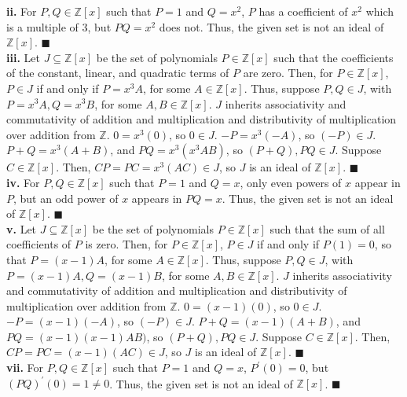 \documentclass{article}%
\begin{document}
\textbf{ii.} For $P, Q \in \mathbb{Z}[x]$ such that $P = 1$ and $Q = x^2$, $P$
has a coefficient of $x^2$ which is a multiple of $3$, but $PQ = x^2$ does
not. Thus, the given set is not an ideal of $\mathbb{Z}[x]$.
\qquad $\blacksquare$ \\

\textbf{iii.} Let $J \subseteq \mathbb{Z}[x]$ be the set of polynomials $P \in
\mathbb{Z}[x]$ such that the coefficients of the constant, linear, and
quadratic terms of $P$ are zero. Then, for $P \in \mathbb{Z}[x]$, $P \in J$ if
and only if $P = x^3A$, for some $A \in \mathbb{Z}[x]$. Thus, suppose $P, Q
\in J$, with $P = x^3A, Q = x^3B$, for some $A, B \in \mathbb{Z}[x]$. $J$
inherits associativity and commutativity of addition and multiplication and
distributivity of multiplication over addition from $\mathbb{Z}$.
$0 = x^3(0)$, so $0 \in J$. $-P = x^3(-A)$, so $(-P) \in J$.
$P + Q = x^3(A + B)$, and $PQ = x^3(x^3AB)$, so $(P + Q), PQ \in J$. Suppose
$C \in \mathbb{Z}[x]$. Then, $CP = PC = x^3(AC) \in J$, so $J$ is an ideal of
$\mathbb{Z}[x]$. \qquad $\blacksquare$ \\

\textbf{iv.} For $P, Q \in \mathbb{Z}[x]$ such that $P = 1$ and $Q = x$, only
even powers of $x$ appear in $P$, but an odd power of $x$ appears in $PQ = x$.
Thus, the given set is not an ideal of $\mathbb{Z}[x]$.
\qquad $\blacksquare$ \\

\textbf{v.} Let $J \subseteq \mathbb{Z}[x]$ be the set of polynomials $P \in
\mathbb{Z}[x]$ such that the sum of all coefficients of $P$ is zero.
Then, for $P \in \mathbb{Z}[x]$, $P \in J$ if and only if $P(1) = 0$, so that
$P = (x - 1)A$, for some $A \in \mathbb{Z}[x]$. Thus, suppose $P, Q
\in J$, with $P = (x - 1)A, Q = (x - 1)B$, for some $A, B \in \mathbb{Z}[x]$.
$J$ inherits associativity and commutativity of addition and multiplication
and distributivity of multiplication over addition from $\mathbb{Z}$.
$0 = (x - 1)(0)$, so $0 \in J$. $-P = (x - 1)(-A)$, so $(-P) \in J$.
$P + Q = (x - 1)(A + B)$, and $PQ = (x - 1)(x - 1)AB)$, so
$(P + Q), PQ \in J$. Suppose $C \in \mathbb{Z}[x]$. Then,
$CP = PC = (x -1)(AC) \in J$, so $J$ is an ideal of $\mathbb{Z}[x]$.
\qquad $\blacksquare$ \\

\textbf{vii.} For $P, Q \in \mathbb{Z}[x]$ such that $P = 1$ and $Q = x$,
$P^{\prime}(0) = 0$, but $(PQ)^{\prime}(0) = 1 \neq 0$. Thus, the given set is
not an ideal of $\mathbb{Z}[x]$. \qquad $\blacksquare$ \\
\end{document}
